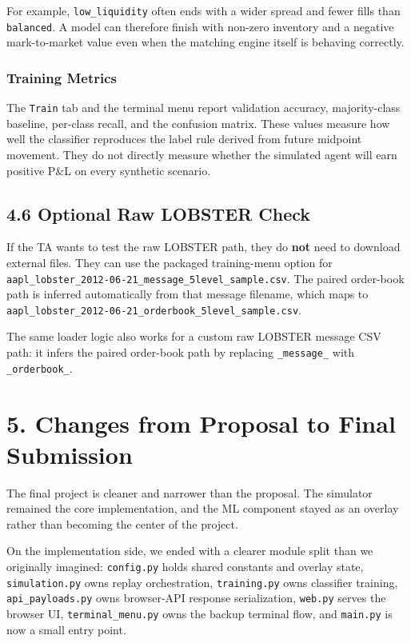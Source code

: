 \documentclass[11pt]{article}
\begin{document}
For example, \texttt{low\_liquidity} often ends with a wider spread and fewer
fills than \texttt{balanced}. A model can therefore finish with non-zero
inventory and a negative mark-to-market value even when the matching engine
itself is behaving correctly.

\subsubsection*{Training Metrics}
The \texttt{Train} tab and the terminal menu report validation accuracy,
majority-class baseline, per-class recall, and the confusion matrix. These
values measure how
well the classifier reproduces the label rule derived from future midpoint
movement. They do not directly measure whether the simulated agent will earn
positive P\&L on every synthetic scenario.

\subsection*{4.6 Optional Raw LOBSTER Check}
If the TA wants to test the raw LOBSTER path, they do \textbf{not} need to
download external files. They can use the packaged training-menu option for
\texttt{aapl\_lobster\_2012-06-21\_message\_5level\_sample.csv}. The paired
order-book path is inferred automatically from that message filename, which
maps to
\texttt{aapl\_lobster\_2012-06-21\_orderbook\_5level\_sample.csv}.

The same loader logic also works for a custom raw LOBSTER message CSV path: it
infers the paired order-book path by replacing \texttt{\_message\_} with
\texttt{\_orderbook\_}.

\section*{5. Changes from Proposal to Final Submission}
The final project is cleaner and narrower than the proposal. The simulator
remained the core implementation, and the ML component stayed as an
overlay rather than becoming the center of the project.

On the implementation side, we ended with a clearer module split than we
originally imagined: \texttt{config.py} holds shared constants and overlay
state, \texttt{simulation.py} owns replay orchestration, \texttt{training.py}
owns classifier training, \texttt{api\_payloads.py} owns browser-API response
serialization, \texttt{web.py} serves the browser UI,
\texttt{terminal\_menu.py} owns the backup terminal flow, and \texttt{main.py}
is now a small entry point.
\end{document}
